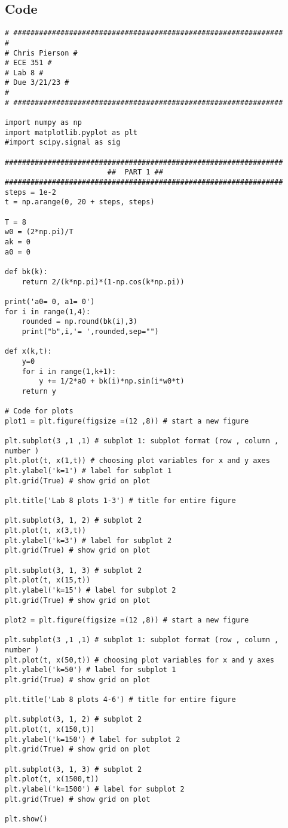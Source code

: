 \subsection{Code}

\begin{scriptsize}
\begin{lstlisting}
# ###############################################################
# 
# Chris Pierson #
# ECE 351 #
# Lab 8 #
# Due 3/21/23 #
# 
# ###############################################################

import numpy as np
import matplotlib.pyplot as plt
#import scipy.signal as sig

#################################################################
                        ##  PART 1 ##
#################################################################
steps = 1e-2
t = np.arange(0, 20 + steps, steps) 

T = 8
w0 = (2*np.pi)/T
ak = 0
a0 = 0

def bk(k):
    return 2/(k*np.pi)*(1-np.cos(k*np.pi))
    
print('a0= 0, a1= 0')
for i in range(1,4):
    rounded = np.round(bk(i),3)   
    print("b",i,'= ',rounded,sep="")

def x(k,t):
    y=0
    for i in range(1,k+1):
        y += 1/2*a0 + bk(i)*np.sin(i*w0*t)
    return y

# Code for plots
plot1 = plt.figure(figsize =(12 ,8)) # start a new figure

plt.subplot(3 ,1 ,1) # subplot 1: subplot format (row , column , number )
plt.plot(t, x(1,t)) # choosing plot variables for x and y axes
plt.ylabel('k=1') # label for subplot 1
plt.grid(True) # show grid on plot

plt.title('Lab 8 plots 1-3') # title for entire figure 

plt.subplot(3, 1, 2) # subplot 2
plt.plot(t, x(3,t))
plt.ylabel('k=3') # label for subplot 2
plt.grid(True) # show grid on plot

plt.subplot(3, 1, 3) # subplot 2
plt.plot(t, x(15,t))
plt.ylabel('k=15') # label for subplot 2
plt.grid(True) # show grid on plot

plot2 = plt.figure(figsize =(12 ,8)) # start a new figure

plt.subplot(3 ,1 ,1) # subplot 1: subplot format (row , column , number )
plt.plot(t, x(50,t)) # choosing plot variables for x and y axes
plt.ylabel('k=50') # label for subplot 1
plt.grid(True) # show grid on plot

plt.title('Lab 8 plots 4-6') # title for entire figure 

plt.subplot(3, 1, 2) # subplot 2
plt.plot(t, x(150,t))
plt.ylabel('k=150') # label for subplot 2
plt.grid(True) # show grid on plot

plt.subplot(3, 1, 3) # subplot 2
plt.plot(t, x(1500,t))
plt.ylabel('k=1500') # label for subplot 2
plt.grid(True) # show grid on plot

plt.show()

\end{lstlisting}
\end{scriptsize}

